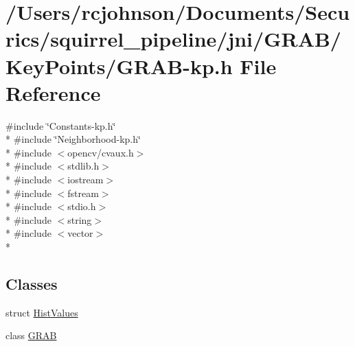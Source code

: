 \hypertarget{_g_r_a_b-kp_8h}{\section{/\-Users/rcjohnson/\-Documents/\-Securics/squirrel\-\_\-pipeline/jni/\-G\-R\-A\-B/\-Key\-Points/\-G\-R\-A\-B-\/kp.h File Reference}
\label{_g_r_a_b-kp_8h}
}
{\ttfamily \#include \char`\"{}Constants-\/kp.\-h\char`\"{}}\\*
{\ttfamily \#include \char`\"{}Neighborhood-\/kp.\-h\char`\"{}}\\*
{\ttfamily \#include $<$opencv/cvaux.\-h$>$}\\*
{\ttfamily \#include $<$stdlib.\-h$>$}\\*
{\ttfamily \#include $<$iostream$>$}\\*
{\ttfamily \#include $<$fstream$>$}\\*
{\ttfamily \#include $<$stdio.\-h$>$}\\*
{\ttfamily \#include $<$string$>$}\\*
{\ttfamily \#include $<$vector$>$}\\*
\subsection*{Classes}
\begin{DoxyCompactItemize}
\item 
struct \hyperlink{struct_hist_values}{Hist\-Values}
\item 
class \hyperlink{class_g_r_a_b}{G\-R\-A\-B}
\end{DoxyCompactItemize}
